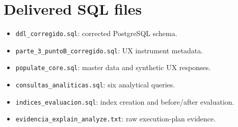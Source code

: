 \documentclass[11pt]{article}
\begin{document}
\section{Delivered SQL files}
\begin{itemize}
    \item \texttt{ddl\_corregido.sql}: corrected PostgreSQL schema.
    \item \texttt{parte\_3\_puntoB\_corregido.sql}: UX instrument metadata.
    \item \texttt{populate\_core.sql}: master data and synthetic UX responses.
    \item \texttt{consultas\_analiticas.sql}: six analytical queries.
    \item \texttt{indices\_evaluacion.sql}: index creation and before/after evaluation.
    \item \texttt{evidencia\_explain\_analyze.txt}: raw execution-plan evidence.
\end{itemize}
\end{document}
